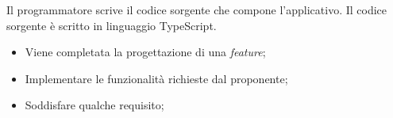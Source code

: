 \label{codifica}

Il programmatore scrive il codice sorgente che compone l'applicativo. Il codice
sorgente è scritto in linguaggio TypeScript.

\begin{itemize}
	\item Viene completata la progettazione di una \textit{feature};
\end{itemize}

\begin{itemize}
	\item Implementare le funzionalità richieste dal proponente;

	\item Soddisfare qualche requisito;
\end{itemize}

